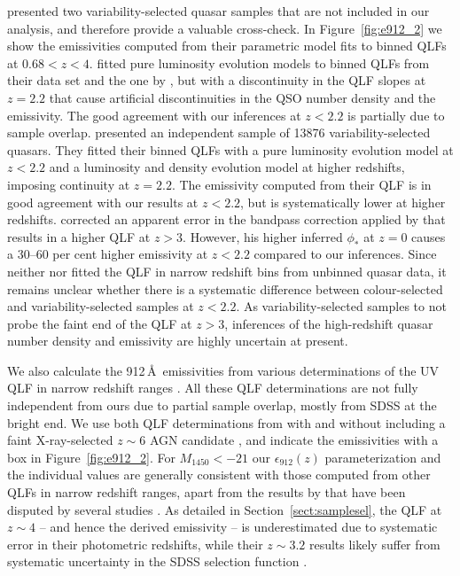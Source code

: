 \documentclass[fleqn,usenatbib]{mnras}
\begin{document}
\citet{2013A&A...551A..29P,2016A&A...587A..41P} presented two
variability-selected quasar samples that are not included in our
analysis, and therefore provide a valuable cross-check.  In
Figure~\ref{fig:e912_2} we show the emissivities computed from their
parametric model fits to binned QLFs at
$0.68<z<4$. \citet{2013A&A...551A..29P} fitted pure luminosity
evolution models to binned QLFs from their data set and the one by
\citet{2009MNRAS.399.1755C}, but with a discontinuity in the QLF
slopes at $z=2.2$ that cause artificial discontinuities in the QSO
number density and the emissivity. The good agreement with our
inferences at $z<2.2$ is partially due to sample
overlap. \citet{2016A&A...587A..41P} presented an independent sample
of 13876 variability-selected quasars. They fitted their binned QLFs
with a pure luminosity evolution model at $z<2.2$ and a luminosity and
density evolution model at higher redshifts, imposing continuity at
$z=2.2$. The emissivity computed from their QLF is in good agreement
with our results at $z<2.2$, but is systematically lower at higher
redshifts. \citet{2017A&A...608A..64C} corrected an apparent error in
the bandpass correction applied by \citet{2016A&A...587A..41P} that
results in a higher QLF at $z>3$.  However, his higher inferred
$\phi_*$ at $z=0$ causes a 30--60 per cent higher emissivity at
$z<2.2$ compared to our inferences. Since neither
\citet{2013A&A...551A..29P,2016A&A...587A..41P} nor
\citet{2017A&A...608A..64C} fitted the QLF in narrow redshift bins
from unbinned quasar data, it remains unclear whether there is a
systematic difference between colour-selected and variability-selected
samples at $z<2.2$. As variability-selected samples to not probe the
faint end of the QLF at $z>3$, inferences of the high-redshift quasar
number density and emissivity are highly uncertain at present.

We also calculate the 912\,\AA\ emissivities from various
determinations of the UV QLF in narrow redshift ranges
\citep{2009A&A...507..781S,2012ApJ...755..169M,2015AA...578A..83G,2017ApJ...847L..15O,2018PASJ...70S..34A,2018AJ....155..131M,2018MNRAS.474.2904P}.
All these QLF determinations are not fully independent from ours due
to partial sample overlap, mostly from SDSS at the bright end. We use
both QLF determinations from \citet{2017ApJ...847L..15O} with and
without including a faint X-ray-selected $z\sim 6$ AGN candidate
\citep{2018MNRAS.474.2904P}, and indicate the emissivities with a box
in Figure~\ref{fig:e912_2}.  For $M_{1450}<-21$ our
$\epsilon_{912}\left(z\right)$ parameterization and the individual
values are generally consistent with those computed from other QLFs in
narrow redshift ranges, apart from the results by
\citet{2015AA...578A..83G} that have been disputed by several studies
\citep[][see Appendix~\ref{sec:conv} for further
  discussion]{2015MNRAS.453.1946G,2016MNRAS.463..348V,2017MNRAS.465.1915R,2018AJ....155..131M,2018MNRAS.474.2904P}.
As detailed in Section~\ref{sect:samplesel}, the
\citet{2012ApJ...755..169M} QLF at $z\sim 4$ -- and hence the derived
emissivity -- is underestimated due to systematic error in their
photometric redshifts, while their $z\sim 3.2$ results likely suffer
from systematic uncertainty in the SDSS selection function
\citep{2011ApJ...728...23W,2012ApJS..199....3R,2013ApJ...773...14R}.
\end{document}
